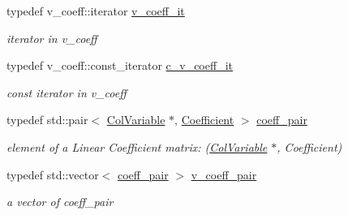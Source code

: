 \begin{Indent}
\begin{DoxyCompactItemize}
typedef v\+\_\+coeff\+::iterator \mbox{\hyperlink{class_s_m_spp__di__unipi__it_1_1_linear_function_a9055902e93c6b3c7eaeae455796565e7}{v\+\_\+coeff\+\_\+it}}
\begin{DoxyCompactList}\small\item\em iterator in v\+\_\+coeff \end{DoxyCompactList}\item 
\mbox{\label{class_s_m_spp__di__unipi__it_1_1_linear_function_a9e665512d3a7f7aae5031e99c675cc11}} 
typedef v\+\_\+coeff\+::const\+\_\+iterator \mbox{\hyperlink{class_s_m_spp__di__unipi__it_1_1_linear_function_a9e665512d3a7f7aae5031e99c675cc11}{c\+\_\+v\+\_\+coeff\+\_\+it}}
\begin{DoxyCompactList}\small\item\em const iterator in v\+\_\+coeff \end{DoxyCompactList}\item 
\mbox{\label{class_s_m_spp__di__unipi__it_1_1_linear_function_a18d7168f3e3f42e50b333b5207ae241c}} 
typedef std\+::pair$<$ \mbox{\hyperlink{class_s_m_spp__di__unipi__it_1_1_col_variable}{Col\+Variable}} $\ast$, \mbox{\hyperlink{class_s_m_spp__di__unipi__it_1_1_linear_function_a1fa0f848dbb8d52dc62a1adfee1a1f90}{Coefficient}} $>$ \mbox{\hyperlink{class_s_m_spp__di__unipi__it_1_1_linear_function_a18d7168f3e3f42e50b333b5207ae241c}{coeff\+\_\+pair}}
\begin{DoxyCompactList}\small\item\em element of a Linear Coefficient matrix\+: (\mbox{\hyperlink{class_s_m_spp__di__unipi__it_1_1_col_variable}{Col\+Variable}} $\ast$, Coefficient) \end{DoxyCompactList}\item 
\mbox{\label{class_s_m_spp__di__unipi__it_1_1_linear_function_aee8988faa66c7c9013613e2c76580ddf}} 
typedef std\+::vector$<$ \mbox{\hyperlink{class_s_m_spp__di__unipi__it_1_1_linear_function_a18d7168f3e3f42e50b333b5207ae241c}{coeff\+\_\+pair}} $>$ \mbox{\hyperlink{class_s_m_spp__di__unipi__it_1_1_linear_function_aee8988faa66c7c9013613e2c76580ddf}{v\+\_\+coeff\+\_\+pair}}
\begin{DoxyCompactList}\small\item\em a vector of coeff\+\_\+pair \end{DoxyCompactList}\item 

\end{DoxyCompactItemize}
\end{Indent}
